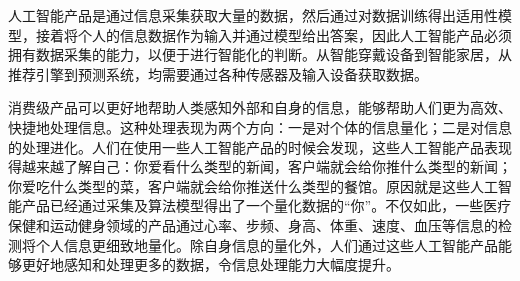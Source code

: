 \documentclass[letterpaper,10pt,english]{sphinxmanual}
\begin{document}
人工智能产品是通过信息采集获取大量的数据，然后通过对数据训练得出适用性模型，接着将个人的信息数据作为输入并通过模型给出答案，因此人工智能产品必须拥有数据采集的能力，以便于进行智能化的判断。从智能穿戴设备到智能家居，从推荐引擎到预测系统，均需要通过各种传感器及输入设备获取数据。

消费级产品可以更好地帮助人类感知外部和自身的信息，能够帮助人们更为高效、快捷地处理信息。这种处理表现为两个方向：一是对个体的信息量化；二是对信息的处理进化。人们在使用一些人工智能产品的时候会发现，这些人工智能产品表现得越来越了解自己：你爱看什么类型的新闻，客户端就会给你推什么类型的新闻；你爱吃什么类型的菜，客户端就会给你推送什么类型的餐馆。原因就是这些人工智能产品已经通过采集及算法模型得出了一个量化数据的“你”。不仅如此，一些医疗保健和运动健身领域的产品通过心率、步频、身高、体重、速度、血压等信息的检测将个人信息更细致地量化。除自身信息的量化外，人们通过这些人工智能产品能够更好地感知和处理更多的数据，令信息处理能力大幅度提升。
\end{document}
